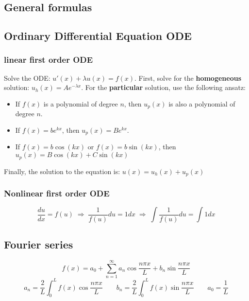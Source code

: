 \documentclass{article}
\begin{document}
\begin{twocolumn}
\section{General formulas}

\subsection{Ordinary Differential Equation ODE}

\subsubsection{linear first order ODE}

Solve the ODE: $u'(x) + \lambda u(x) = f(x)$.
First, solve for the \textbf{homogeneous} solution: $u_h(x) = A e^{-\lambda x}$.
For the \textbf{particular} solution, use the following ansatz:
\begin{itemize}
	\item If $f(x)$ is a polynomial of degree $n$, then $u_p(x)$ is also a polynomial of degree $n$. 
	\item If $f(x) = b e^{k x}$, then $u_p(x) = B e^{k x}$. 
	\item If $f(x) = b \cos(k x)$ or $f(x) = b \sin(k x)$, then $u_p(x) = B \cos(k x) + C \sin (k x)$ 
\end{itemize}
Finally, the solution to the equation is: $u(x) = u_h(x) + u_p(x)$

\subsubsection{Nonlinear first order ODE}

$$\frac{du}{dx} = f(u) \;\Rightarrow\; \frac{1}{f(u)} du = 1 dx \;\Rightarrow\; \int \frac{1}{f(u)} du = \int 1 dx $$

\subsection{Fourier series}

$$f(x) = a_0 + \sum_{n=1}^{\infty} a_n \cos \frac{n\pi x}{L} + b_n \sin \frac{n\pi x}{L} $$
$$a_n = \frac{2}{L} \int_{0}^{L} f(x) \cos \frac{n \pi x}{L} \qquad b_n = \frac{2}{L} \int_0^L f(x) \sin \frac{n \pi x}{L} \qquad a_0 = \frac{1}{L}$$


\end{twocolumn}
\end{document}
